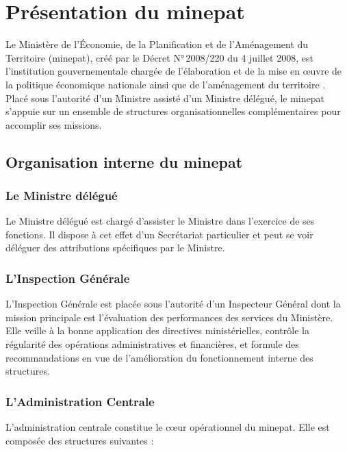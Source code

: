 \documentclass[12pt, a4paper, oneside]{report}
\begin{document}
\section[Présentation du MINEPAT]{Présentation du \gls{minepat}}
\label{sec:minepat}

Le Ministère de l'Économie, de la Planification et de l'Aménagement du Territoire (\gls{minepat}), créé par le Décret N°\,2008/220 du 4 juillet 2008, est l'institution gouvernementale chargée de l'élaboration et de la mise en œuvre de la politique économique nationale ainsi que de l'aménagement du territoire \cite{decret2008}. Placé sous l'autorité d'un Ministre assisté d'un Ministre délégué, le \gls{minepat} s'appuie sur un ensemble de structures organisationnelles complémentaires pour accomplir ses missions.

\subsection{Organisation interne du \gls{minepat}}

\subsubsection{Le Ministre délégué}

Le Ministre délégué est chargé d'assister le Ministre dans l'exercice de ses fonctions. Il dispose à cet effet d'un Secrétariat particulier et peut se voir déléguer des attributions spécifiques par le Ministre.

\subsubsection{L'Inspection Générale}

L'Inspection Générale est placée sous l'autorité d'un Inspecteur Général dont la mission principale est l'évaluation des performances des services du Ministère. Elle veille à la bonne application des directives ministérielles, contrôle la régularité des opérations administratives et financières, et formule des recommandations en vue de l'amélioration du fonctionnement interne des structures.

\subsubsection{L'Administration Centrale}

L'administration centrale constitue le cœur opérationnel du \gls{minepat}. Elle est composée des structures suivantes :
\end{document}
